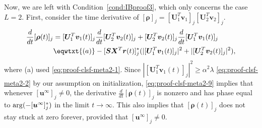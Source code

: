 \documentclass{article} %
\def\vr{{\bm{r}}}
\def\vu{{\bm{u}}}
\def\vv{{\bm{v}}}
\def\mS{{\bm{S}}}
\def\mU{{\bm{U}}}
\def\mX{{\bm{X}}}
\newcommand{\vrho}{{\bm{\rho}}}
\newcommand{\Arg}{\mathop{\rm arg}}
\begin{document}
Now, we are left with Condition~\ref{cond:IBproof3}, which only concerns the case $L = 2$.
First, consider the time derivative of $[\vrho]_j = [\mU_1^T \vv_1]_j [\mU_2^T \vv_2]_j$.
\begin{align}
    \frac{d}{dt} [\vrho(t)]_j
    &=[\mU_1^T \vv_1(t)]_j \frac{d}{dt} [\mU_2^T \vv_2(t)]_j
    + [\mU_2^T \vv_2(t)]_j \frac{d}{dt} [\mU_1^T \vv_1(t)]_j\notag\\
    &\eqwtxt{(a)}
    -[\mS\mX^T \vr(t)]_j^* (|[\mU_1^T \vv_1(t)]_j|^2 + |[\mU_2^T \vv_2(t)]_j|^2),\label{eq:proof-clsf-meta2-9}
\end{align}
where (a) used \eqref{eq:proof-clsf-meta2-1}.
Since $|[\mU_1^T \vv_1(t)]_j|^2 \geq \alpha^2 \lambda$ \eqref{eq:proof-clsf-meta2-2} by our assumption on initialization, \eqref{eq:proof-clsf-meta2-9} implies that whenever $[\vu^\infty]_j \neq 0$, the derivative $\frac{d}{dt} [\vrho(t)]_j$ is nonzero and has phase equal to $\Arg(-[\vu^\infty]_j^*)$ in the limit $t \to \infty$. This also implies that $[\vrho(t)]_j$ does not stay stuck at zero forever, provided that $[\vu^\infty]_j \neq 0$. 
\end{document}
